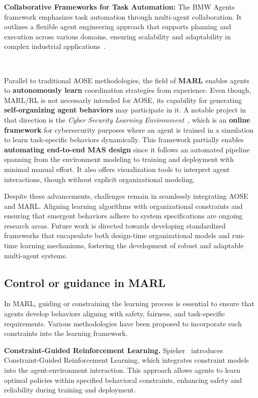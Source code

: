 \documentclass[pdflatex,sn-mathphys-num]{sn-jnl}%
\theoremstyle{thmstyleone}%
\theoremstyle{thmstyletwo}%
\theoremstyle{thmstylethree}%
\begin{document}
\textbf{Collaborative Frameworks for Task Automation:} The BMW Agents framework emphasizes task automation through multi-agent collaboration. It outlines a flexible agent engineering approach that supports planning and execution across various domains, ensuring scalability and adaptability in complex industrial applications~\cite{crawford2024bmw}.

\

Parallel to traditional AOSE methodologies, the field of \textbf{MARL} enables agents to \textbf{autonomously learn} coordination strategies from experience. Even though, MARL/RL is not necessarly intended for AOSE, its capability for generating \textbf{self-organizing agent behaviors} may participate in it.
A notable project in that direction is the \textit{Cyber Security Learning Environment}~\cite{hammar2023scalable}, which is an \textbf{online framework} for cybersecurity purposes where an agent is trained in a simulation to learn task-specific behaviors dynamically. This framework partially enables \textbf{automating end-to-end MAS design} since it follows an automated pipeline spanning from the environment modeling to training and deployment with minimal manual effort. It also offers visualization tools to interpret agent interactions, though without explicit organizational modeling.

Despite these advancements, challenges remain in seamlessly integrating AOSE and MARL. Aligning learning algorithms with organizational constraints and ensuring that emergent behaviors adhere to system specifications are ongoing research areas. Future work is directed towards developing standardized frameworks that encapsulate both design-time organizational models and run-time learning mechanisms, fostering the development of robust and adaptable multi-agent systems.


\subsection{Control or guidance in MARL}\label{sub-sec:rel_control}

In MARL, guiding or constraining the learning process is essential to ensure that agents develop behaviors aligning with safety, fairness, and task-specific requirements. Various methodologies have been proposed to incorporate such constraints into the learning framework.

\textbf{Constraint-Guided Reinforcement Learning.} Spieker~\cite{spieker2021constraint} introduces Constraint-Guided Reinforcement Learning, which integrates constraint models into the agent-environment interaction. This approach allows agents to learn optimal policies within specified behavioral constraints, enhancing safety and reliability during training and deployment.
\end{document}
